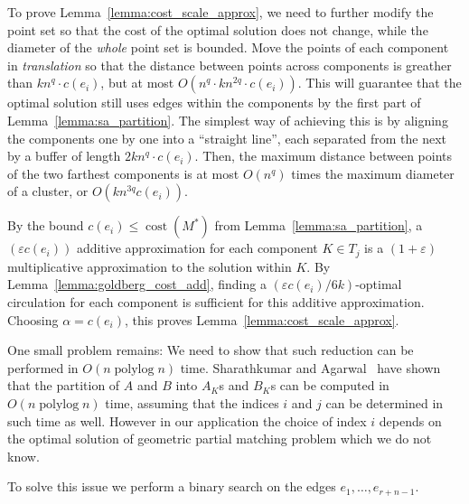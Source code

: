 \documentclass[a4paper,UKenglish]{socg-lipics-v2018}
\makeatletter
\def\polylog{\mathop{\mathrm{polylog}}}
\def\eps{\varepsilon}
\def\cost{\operatorname{cost}}
\theoremstyle{plain}
\numberwithin{figure}{section}
\def\n@te#1{\textsf{\boldmath \textbf{$\langle\!\langle$#1$\rangle\!\rangle$}}\leavevmode}
\def\note#1{\textcolor{red}{\n@te{#1}}}
\renewcommand{\note}[1]{} %
\makeatother
\begin{document}
\begin{toappendix}
To prove Lemma~\ref{lemma:cost_scale_approx}, we need to further modify the point set so that the cost of the optimal solution does not change, while the diameter of the \emph{whole} point set is bounded.
%
Move the points of each component in \emph{translation} so that the distance between points across components is greather than $kn^q \cdot c(e_i)$, but at most $O(n^q \cdot kn^{2q} \cdot c(e_i))$.
This will guarantee that the optimal solution still uses edges within the components by the first part of Lemma~\ref{lemma:sa_partition}.
The simplest way of achieving this is by aligning the components one by one into a ``straight line'',
each separated from the next by a buffer of length $2kn^{q} \cdot c(e_i)$.
Then, the maximum distance between points of the two farthest components is
at most $O(n^q)$ times the maximum diameter of a cluster, or $O(kn^{3q} c(e_i))$.

By the bound $c(e_i) \leq \cost(M^*)$ from Lemma~\ref{lemma:sa_partition},
a $(\eps c(e_i))$ additive approximation for each component $K \in T_j$ is
a $(1 + \eps)$ multiplicative approximation to the solution within $K$.
By Lemma~\ref{lemma:goldberg_cost_add}, finding a $(\eps c(e_i)/6k)$-optimal
circulation for each component is sufficient for this additive approximation.
Choosing $\alpha = c(e_i)$, this proves Lemma~\ref{lemma:cost_scale_approx}.


One small problem remains: We need to show that such reduction can be performed in $O(n\polylog n)$ time.
Sharathkumar and Agarwal~\cite{SA12} have shown that the partition of $A$ and $B$ into $A_K$s and $B_K$s can be computed in $O(n \polylog n)$ time, assuming that the indices $i$ and $j$ can be determined in such time as well.  However in our application the choice of index $i$ depends on the optimal solution of geometric partial matching problem which we do not know.

To solve this issue we perform a binary search on the edges $e_1, \ldots, e_{r+n-1}$.  \note{Hmm, we have no way to check Lemma 4.5(i); but in fact a polynomial bound is good enough.}


\end{toappendix}
\end{document}
